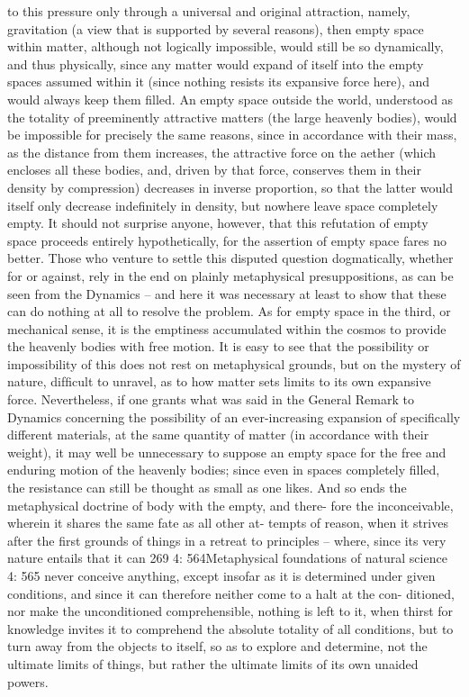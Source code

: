 to this pressure only through a universal and original attraction, namely,
gravitation (a view that is supported by several reasons), then empty
space within matter, although not logically impossible, would still be
so dynamically, and thus physically, since any matter would expand of
itself into the empty spaces assumed within it (since nothing resists its
expansive force here), and would always keep them ﬁlled. An empty
space outside the world, understood as the totality of preeminently
attractive matters (the large heavenly bodies), would be impossible for
precisely the same reasons, since in accordance with their mass, as the
distance from them increases, the attractive force on the aether (which
encloses all these bodies, and, driven by that force, conserves them in
their density by compression) decreases in inverse proportion, so that
the latter would itself only decrease indeﬁnitely in density, but nowhere
leave space completely empty. It should not surprise anyone, however,
that this refutation of empty space proceeds entirely hypothetically,
for the assertion of empty space fares no better. Those who venture to
settle this disputed question dogmatically, whether for or against, rely
in the end on plainly metaphysical presuppositions, as can be seen from
the Dynamics – and here it was necessary at least to show that these can
do nothing at all to resolve the problem. As for empty space in the third,
or mechanical sense, it is the emptiness accumulated within the cosmos
to provide the heavenly bodies with free motion. It is easy to see that
the possibility or impossibility of this does not rest on metaphysical
grounds, but on the mystery of nature, difﬁcult to unravel, as to how
matter sets limits to its own expansive force. Nevertheless, if one
grants what was said in the General Remark to Dynamics concerning
the possibility of an ever-increasing expansion of speciﬁcally different
materials, at the same quantity of matter (in accordance with their
weight), it may well be unnecessary to suppose an empty space for the
free and enduring motion of the heavenly bodies; since even in spaces
completely ﬁlled, the resistance can still be thought as small as one
likes.
And so ends the metaphysical doctrine of body with the empty, and there-
fore the inconceivable, wherein it shares the same fate as all other at-
tempts of reason, when it strives after the ﬁrst grounds of things in a
retreat to principles – where, since its very nature entails that it can
269
4: 564Metaphysical foundations of natural science
4: 565
never conceive anything, except insofar as it is determined under given
conditions, and since it can therefore neither come to a halt at the con-
ditioned, nor make the unconditioned comprehensible, nothing is left
to it, when thirst for knowledge invites it to comprehend the absolute
totality of all conditions, but to turn away from the objects to itself, so
as to explore and determine, not the ultimate limits of things, but rather
the ultimate limits of its own unaided powers.
